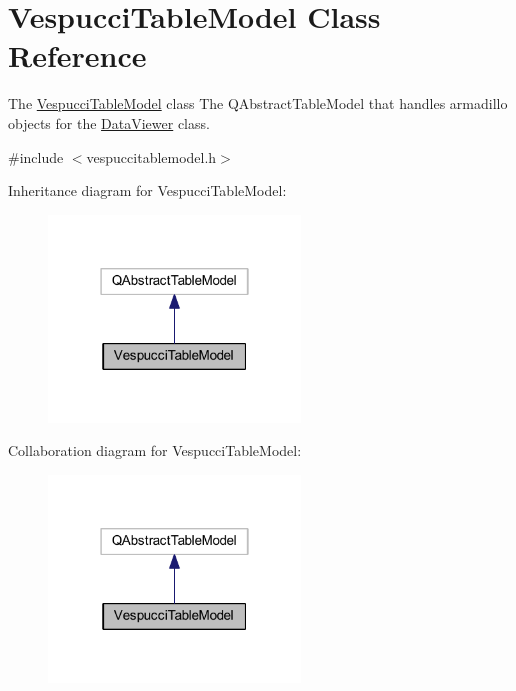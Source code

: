 \hypertarget{class_vespucci_table_model}{\section{Vespucci\+Table\+Model Class Reference}
\label{class_vespucci_table_model}
}


The \hyperlink{class_vespucci_table_model}{Vespucci\+Table\+Model} class The Q\+Abstract\+Table\+Model that handles armadillo objects for the \hyperlink{class_data_viewer}{Data\+Viewer} class.  




{\ttfamily \#include $<$vespuccitablemodel.\+h$>$}



Inheritance diagram for Vespucci\+Table\+Model\+:\nopagebreak
\begin{figure}[H]
\begin{center}
\leavevmode
\includegraphics[width=190pt]{class_vespucci_table_model__inherit__graph}
\end{center}
\end{figure}


Collaboration diagram for Vespucci\+Table\+Model\+:\nopagebreak
\begin{figure}[H]
\begin{center}
\leavevmode
\includegraphics[width=190pt]{class_vespucci_table_model__coll__graph}
\end{center}
\end{figure}

